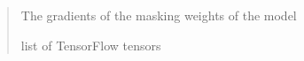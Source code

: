 \documentclass[letterpaper,10pt,english]{sphinxmanual}
\begin{document}
\begin{fulllineitems}
\begin{itemize}
\begin{description}
\end{description}

\end{itemize}
\begin{quote}\begin{description}
\sphinxAtStartPar
{} \textendash{} The gradients of the masking weights of the model

\sphinxAtStartPar
list of TensorFlow tensors

\end{description}\end{quote}

\end{fulllineitems}

\end{document}
